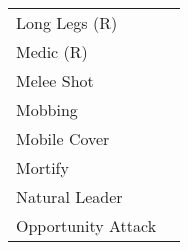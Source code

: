 \begin{table}[]
\begin{tabular}{ll}
    Long Legs (R)      &                                                                                                                                                                                                                                                                                   \\
    Medic (R)          &                                                                                                                                                                                                                                                                                   \\
    Melee Shot         &                                                                                                                                                                                                                                                                                   \\
    Mobbing            &                                                                                                                                                                                                                                                                                   \\
    Mobile Cover       &                                                                                                                                                                                                                                                                                   \\
    Mortify            &                                                                                                                                                                                                                                                                                   \\
    Natural Leader     &                                                                                                                                                                                                                                                                                   \\
    Opportunity Attack &                                                                                                                                                                                                                                                                                   \\

\end{tabular}
\end{table}
